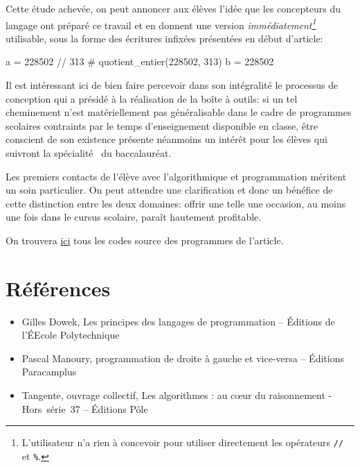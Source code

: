 Cette étude achevée, on peut annoncer aux élèves l'idée que les concepteurs du langage ont préparé ce travail et en donnent une version \emph{immédiatement\footnote{L'utilisateur n'a rien à concevoir pour utiliser directement les opérateurs \texttt{//} et \texttt{\%}.}} utilisable, sous la forme des écritures infixées présentées en début d'article:

\begin{python}[essai2.py]
a = 228502 // 313 # quotient\_entier(228502, 313)
b = 228502 %
\end{python}

Il est intéressant ici de bien faire percevoir dans son intégralité le processus de conception qui a présidé à la réalisation de la boîte à outils: si un tel cheminement n'est matériellement pas généralisable dans le cadre de programmes scolaires contraints par le temps d'enseignement disponible en classe, être conscient de son existence présente néanmoins un intérêt pour les élèves qui suivront la spécialité~ du baccalauréat.

Les premiers contacts de l'élève avec l'algorithmique et programmation méritent un soin particulier. On peut attendre une clarification et donc un bénéfice de cette distinction entre les deux domaines: offrir une telle une occasion, au moins une fois dans le cursus scolaire, paraît hautement profitable.

On trouvera \textcolor{red}{\href{./programmes.tar.xz}{ici}} tous les codes source des programmes de l'article.



\section{Références}

\begin{itemize}

\item Gilles Dowek, Les principes des langages de programmation -- Éditions de l'ÉEcole Polytechnique

\medskip
\item Pascal Manoury, programmation de droite à gauche et vice-versa -- Éditions Paracamplus

\medskip
\item Tangente, ouvrage collectif, Les algorithmes : au cœur du raisonnement - Hors~série~37 -- Éditions Pôle

\end{itemize}


